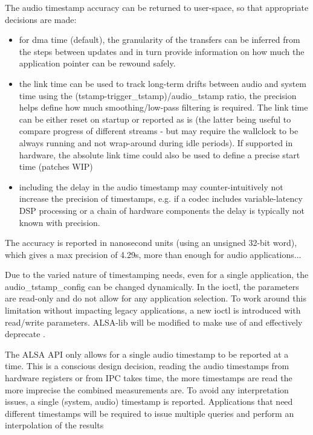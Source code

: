 \documentclass[a4paper,8pt,english]{sphinxmanual}
\begin{document}
The audio timestamp accuracy can be returned to user-space, so that
appropriate decisions are made:
\begin{itemize}
\item {} 
for dma time (default), the granularity of the transfers can be
inferred from the steps between updates and in turn provide
information on how much the application pointer can be rewound
safely.

\item {} 
the link time can be used to track long-term drifts between audio
and system time using the (tstamp-trigger\_tstamp)/audio\_tstamp
ratio, the precision helps define how much smoothing/low-pass
filtering is required. The link time can be either reset on startup
or reported as is (the latter being useful to compare progress of
different streams - but may require the wallclock to be always
running and not wrap-around during idle periods). If supported in
hardware, the absolute link time could also be used to define a
precise start time (patches WIP)

\item {} 
including the delay in the audio timestamp may
counter-intuitively not increase the precision of timestamps, e.g. if a
codec includes variable-latency DSP processing or a chain of
hardware components the delay is typically not known with precision.

\end{itemize}

The accuracy is reported in nanosecond units (using an unsigned 32-bit
word), which gives a max precision of 4.29s, more than enough for
audio applications...

Due to the varied nature of timestamping needs, even for a single
application, the audio\_tstamp\_config can be changed dynamically. In
the  ioctl, the parameters are read-only and do not allow for
any application selection. To work around this limitation without
impacting legacy applications, a new  ioctl is introduced
with read/write parameters. ALSA-lib will be modified to make use of
 and effectively deprecate .

The ALSA API only allows for a single audio timestamp to be reported
at a time. This is a conscious design decision, reading the audio
timestamps from hardware registers or from IPC takes time, the more
timestamps are read the more imprecise the combined measurements
are. To avoid any interpretation issues, a single (system, audio)
timestamp is reported. Applications that need different timestamps
will be required to issue multiple queries and perform an
interpolation of the results
\end{document}
